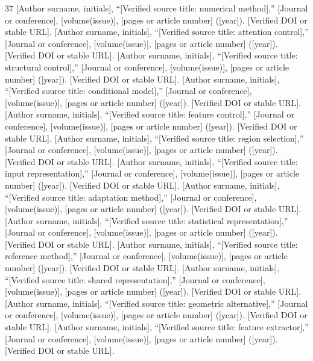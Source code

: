\begin{thebibliography}{37}
 [Author surname, initials], ``[Verified source title: numerical method],'' [Journal or conference], [volume(issue)], [pages or article number] ([year]). [Verified DOI or stable URL].
 [Author surname, initials], ``[Verified source title: attention control],'' [Journal or conference], [volume(issue)], [pages or article number] ([year]). [Verified DOI or stable URL].
 [Author surname, initials], ``[Verified source title: structural control],'' [Journal or conference], [volume(issue)], [pages or article number] ([year]). [Verified DOI or stable URL].
 [Author surname, initials], ``[Verified source title: conditional model],'' [Journal or conference], [volume(issue)], [pages or article number] ([year]). [Verified DOI or stable URL].
 [Author surname, initials], ``[Verified source title: feature control],'' [Journal or conference], [volume(issue)], [pages or article number] ([year]). [Verified DOI or stable URL].
 [Author surname, initials], ``[Verified source title: region selection],'' [Journal or conference], [volume(issue)], [pages or article number] ([year]). [Verified DOI or stable URL].
 [Author surname, initials], ``[Verified source title: input representation],'' [Journal or conference], [volume(issue)], [pages or article number] ([year]). [Verified DOI or stable URL].
 [Author surname, initials], ``[Verified source title: adaptation method],'' [Journal or conference], [volume(issue)], [pages or article number] ([year]). [Verified DOI or stable URL].
 [Author surname, initials], ``[Verified source title: statistical representation],'' [Journal or conference], [volume(issue)], [pages or article number] ([year]). [Verified DOI or stable URL].
 [Author surname, initials], ``[Verified source title: reference method],'' [Journal or conference], [volume(issue)], [pages or article number] ([year]). [Verified DOI or stable URL].
 [Author surname, initials], ``[Verified source title: shared representation],'' [Journal or conference], [volume(issue)], [pages or article number] ([year]). [Verified DOI or stable URL].
 [Author surname, initials], ``[Verified source title: geometric alternative],'' [Journal or conference], [volume(issue)], [pages or article number] ([year]). [Verified DOI or stable URL].
 [Author surname, initials], ``[Verified source title: feature extractor],'' [Journal or conference], [volume(issue)], [pages or article number] ([year]). [Verified DOI or stable URL].

\end{thebibliography}
